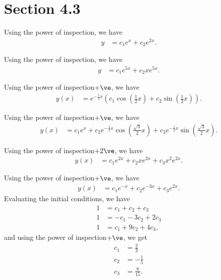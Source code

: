 \documentclass[10pt]{mypackage}
\begin{document}
\section{Section 4.3}%
\begin{solution}[Problem 4]
  Using the power of inspection, we have
  \begin{align*}
    y &= c_1e^{x} + c_2e^{2x}.
  \end{align*}
\end{solution}
\begin{solution}[Problem 6]
  Using the power of inspection, we have
  \begin{align*}
    y &= c_1e^{5x} + c_2xe^{5x}.
  \end{align*}
\end{solution}
\begin{solution}[Problem 12]
  Using the power of inspection$+ \ve$, we have
  \begin{align*}
    y(x) &= e^{-\frac{1}{2}x} \left(c_1\cos\left(\frac{1}{2}x\right) + c_2\sin\left(\frac{1}{2}x\right)\right).
  \end{align*}
\end{solution}
\begin{solution}[Problem 16]
  Using the power of inspection$+\ve$, we have
  \begin{align*}
    y(x) &= c_1e^{x} + c_2e^{-\frac{1}{2}x}\cos\left(\frac{\sqrt{3}}{2}x\right) + c_3e^{-\frac{1}{2}x}\sin\left(\frac{\sqrt{3}}{2}x\right).
  \end{align*}
\end{solution}
\begin{solution}[Problem 22]
  Using the power of inspection$+2\ve$, we have
  \begin{align*}
    y(x) &= c_1e^{2x} + c_2xe^{2x} + c_3x^2e^{2x}.
  \end{align*}
\end{solution}
\begin{solution}[Problem 36]
  Using the power of inspection$+\ve$, we have
  \begin{align*}
    y(x) &= c_1e^{-x} + c_2e^{-3x} + c_3e^{2x}.
  \end{align*}
  Evaluating the initial conditions, we have
  \begin{align*}
    1 &= c_1 + c_2 + c_3\\
    1 &= -c_1 - 3c_2 + 2c_3\\
    1 &= c_1 + 9c_2 + 4c_3,
  \end{align*}
  and using the power of inspection$+\ve$, we get
  \begin{align*}
    c_1 &= \frac{2}{3}\\
    c_2 &= -\frac{1}{5}\\
    c_3 &= \frac{8}{15}.
  \end{align*}
  
\end{solution}
\end{document}
